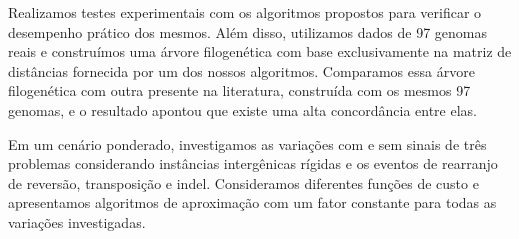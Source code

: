 Realizamos testes experimentais com os algoritmos propostos para verificar o desempenho prático dos mesmos. Além disso, utilizamos dados de 97 genomas reais e construímos uma árvore filogenética com base exclusivamente na matriz de distâncias fornecida por um dos nossos algoritmos. Comparamos essa árvore filogenética com outra presente na literatura, construída com os mesmos 97 genomas, e o resultado apontou que existe uma alta concordância entre elas.

Em um cenário ponderado, investigamos as variações com e sem sinais de três problemas considerando instâncias intergênicas rígidas e os eventos de rearranjo de reversão, transposição e indel. Consideramos diferentes funções de custo e apresentamos algoritmos de aproximação com um fator constante para todas as variações investigadas.